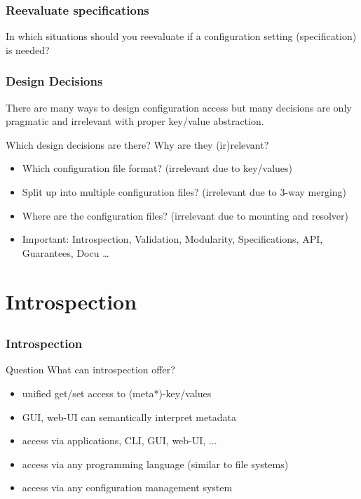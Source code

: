 \begin{frame}
	\frametitle{Reevaluate specifications}

	In which situations should you reevaluate if a configuration setting (specification) is needed?

\end{frame}

\begin{frame}
	\frametitle{Design Decisions}

	There are many ways to design configuration access but many decisions are only pragmatic and irrelevant with proper key/value abstraction.

	\begin{task}
	Which design decisions are there?
	Why are they (ir)relevant?
	\end{task}

	\pause

	\begin{itemize}[<+->]
	\item Which configuration file format? (irrelevant due to key/values)
	\item Split up into multiple configuration files? (irrelevant due to 3-way merging)
	\item Where are the configuration files? (irrelevant due to mounting and resolver)
	\item Important: Introspection, Validation, Modularity, Specifications, API, Guarantees, Docu \dots
	\end{itemize}
\end{frame}






\section{Introspection}

\subsection{}

\begin{frame}
	\frametitle{Introspection}
	\begin{alertblock}{Question}
	What can introspection offer?
	\end{alertblock}

	\pause
	\begin{itemize}
	\item unified get/set access to (meta*)-key/values
	\item GUI, web-UI can semantically interpret metadata
	\item access via applications, CLI, GUI, web-UI, ...
	\item access via any programming language (similar to file systems)
	\item access via any configuration management system
	\end{itemize}
\end{frame}

